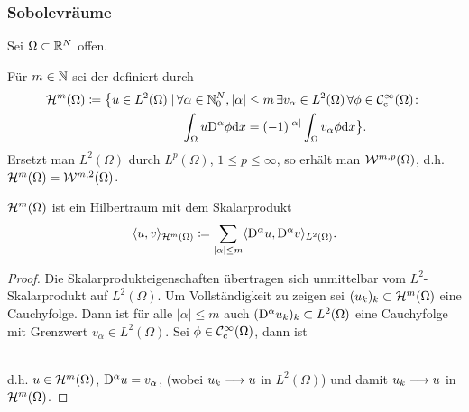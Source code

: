 \subsubsection*{Sobolevräume}
Sei \(\Omega\subset\mathbb{R}^N\) offen.
\begin{definition}
	Für \(m\in\mathbb{N}\) sei der  definiert durch
	\begin{align*}
		\mathcal{H}^m(\Omega)\coloneqq\big\{u\in L^2(\Omega)\mid&\,\forall\alpha\in\mathbb{N}_0^N,|\alpha|\leq m\,\exists v_\alpha\in L^2(\Omega)\,\forall\phi\in\mathcal{C}_{\mathrm{c}}^\infty(\Omega)\colon\\
		&\;\;\int_\Omega u\mathrm{D}^\alpha\phi\mathrm{d}x=(-1)^{|\alpha|}\int_\Omega v_\alpha\phi\mathrm{d}x\big\}.
	\end{align*}
	Ersetzt man \(L^2(\Omega)\) durch \(L^p(\Omega)\), \(1\leq p\leq\infty\), so erhält man \(\mathcal{W}^{m,p}(\Omega)\), d.h. \(\mathcal{H}^m(\Omega)=\mathcal{W}^{m,2}(\Omega)\).
\end{definition}
\begin{satz}
	\(\mathcal{H}^m(\Omega)\) ist ein Hilbertraum mit dem Skalarprodukt
	\begin{equation*}
		\langle u,v\rangle_{\mathcal{H}^m(\Omega)}\coloneqq\sum_{|\alpha|\leq m}\langle \mathrm{D}^\alpha u,\mathrm{D}^\alpha v\rangle_{L^2(\Omega)}.
	\end{equation*}
\end{satz}
\begin{proof}
	Die Skalarprodukteigenschaften übertragen sich unmittelbar vom \(L^2\)-Skalarprodukt auf \(L^2(\Omega)\). Um Vollständigkeit zu zeigen sei \((u_k)_k\subset\mathcal{H}^m(\Omega)\) eine Cauchyfolge. Dann ist für alle \(|\alpha|\leq m\) auch \((\mathrm{D}^\alpha u_k)_k\subset L^2(\Omega)\) eine Cauchyfolge mit Grenzwert \(v_\alpha\in L^2(\Omega)\). Sei \(\phi\in\mathcal{C}_{\mathrm{c}}^\infty(\Omega)\), dann ist
	\begin{figure}[!h]
		\centering
	\end{figure}\\
	d.h. \(u\in\mathcal{H}^m(\Omega)\), \(\mathrm{D}^\alpha u=v_\alpha\), (wobei \(u_k\longrightarrow u\) in \(L^2(\Omega)\)) und damit \(u_k\longrightarrow u\) in \(\mathcal{H}^m(\Omega)\).
\end{proof}
